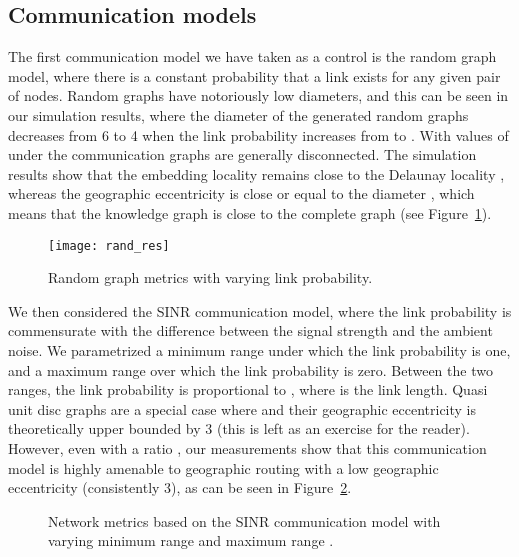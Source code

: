 \documentclass{article}
\begin{document}
\subsection{Communication models}
\label{sub_model}
The first communication model we have taken as a control is the random graph model, where there is a constant probability  that a link exists for any given pair of nodes. Random graphs have notoriously low diameters, and this can be seen in our simulation results, where the diameter of the generated random graphs decreases from 6 to 4 when the link probability increases from  to . With values of  under  the communication graphs are generally disconnected. The simulation results show that the embedding locality  remains close to the Delaunay locality , whereas the geographic eccentricity  is close or equal to the diameter , which means that the knowledge graph  is close to the complete graph  (see Figure~\ref{fig_rand}).
\begin{figure}[h]
\begin{center}
\texttt{[image: rand\_res]}
\caption{Random graph metrics with varying link probability.}
\label{fig_rand}
\end {center}
\end{figure}

We then considered the SINR communication model, where the link probability is commensurate with the difference between the signal strength and the ambient noise. We parametrized a minimum range  under which the link probability is one, and a maximum range  over which the link probability is zero. Between the two ranges, the link probability is proportional to , where  is the link length. Quasi unit disc graphs are a special case where  and their geographic eccentricity is theoretically upper bounded by 3 (this is left as an exercise for the reader). However, even with a ratio , our measurements show that this communication model is highly amenable to geographic routing with a low geographic eccentricity (consistently 3), as can be seen in Figure~\ref{fig_sinr}.
\begin{figure}[h]
\begin{center}
\caption{Network metrics based on the SINR communication model with varying minimum range  and maximum range .}
\label{fig_sinr}
\end{center}
\end{figure}
\end{document}
